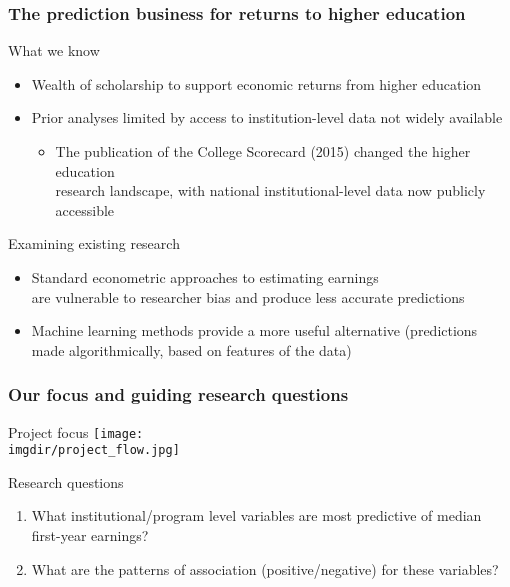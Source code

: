 \documentclass[aspectratio=169, t, 10pt]{beamer}
\begin{document}
\begin{frame}
  \frametitle{The prediction business for returns to higher education}
  \begin{block}{What we know}
    \begin{itemize}
    	\item Wealth of scholarship to support economic returns from
          higher education
          \citep{card:1995, Card:1999, Card:2001, doyle2016educearn, Oreopoulous_Petronijevic_2013}
    	\item Prior analyses limited by access to institution-level data not widely available 
   	 \begin{itemize}
    		\item The publication of the College Scorecard (2015) changed the higher education \\
		research landscape, with national institutional-level
                data now publicly accessible
                \citep{obama_2013}
   	 \end{itemize}
    \end{itemize}
  \end{block}
  \begin{block}{Examining existing research}
    \begin{itemize}
    \item Standard econometric approaches to estimating earnings \\
    are vulnerable to researcher bias and produce less accurate predictions
    \item Machine learning methods provide a more useful alternative (predictions \\
    made algorithmically, based on features of the data)
    \end{itemize}
  \end{block}
\end{frame}

\begin{frame}
  \frametitle{Our focus and guiding research questions}
  \begin{block}{Project focus}
    \centering
    \texttt{[image: \\imgdir/project\_flow.jpg]}
  \end{block}
  \begin{block}{Research questions}
    \begin{enumerate}
        \item What institutional\slash program level variables are most
          predictive of median first-year earnings?
        \item What are the patterns of association (positive\slash negative)
          for these variables?
    \end{enumerate}
   \end{block}
\end{frame}
\end{document}
